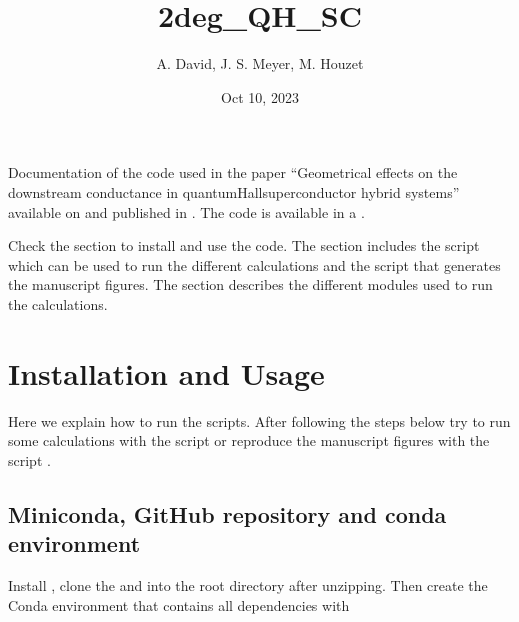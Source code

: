 \documentclass[letterpaper,10pt,english]{sphinxmanual}
\title{2deg\_QH\_SC}
\date{Oct 10, 2023}
\author{A.\@{} David, J.\@{} S.\@{} Meyer, M.\@{} Houzet}
\begin{document}
\pagestyle{empty}
\sphinxmaketitle
\pagestyle{plain}
\sphinxtableofcontents
\pagestyle{normal}
\label{\detokenize{index::doc}}


\sphinxAtStartPar
Documentation of the code used in the paper “Geometrical effects on the downstream conductance in quantum\sphinxhyphen{}Hall\textendash{}superconductor hybrid systems” available on  and published in . The code is available in a .

\sphinxAtStartPar
Check the {\hyperref[\detokenize{usage::doc}]{}} section to install and use the code. The {\hyperref[\detokenize{main_scripts::doc}]{}} section includes the script  which can be used to run the different calculations and the script  that generates the manuscript figures. The {\hyperref[\detokenize{modules::doc}]{}} section describes the different modules used to run the calculations.

\sphinxstepscope


\chapter{Installation and Usage}
\label{\detokenize{usage:installation-and-usage}}\label{\detokenize{usage::doc}}
\sphinxAtStartPar
Here we explain how to run the scripts.
After following the steps below try to run some calculations
with the script  or reproduce the manuscript
figures with the script .


\section{Miniconda, GitHub repository and conda environment}
\label{\detokenize{usage:miniconda-github-repository-and-conda-environment}}
\sphinxAtStartPar
Install 
, clone the 
and  into the root directory  after unzipping.
Then create the Conda environment that contains all dependencies with
\end{document}
